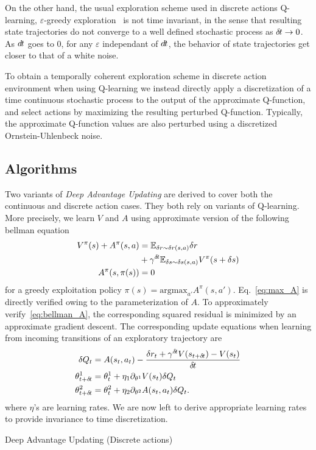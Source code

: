 On the other hand, the usual exploration scheme used in discrete actions
Q-learning, $\varepsilon$-greedy exploration~\cite{sutton} is not time
invariant, in the sense that resulting state trajectories do not converge to a
well defined stochastic process as ${\delta\hspace{-.1em}t} \rightarrow 0$. As $d\hspace{-.1em}t$ goes to $0$,
for any $\varepsilon$ independant of $d\hspace{-.1em}t$, the behavior of state trajectories get
closer to that of a white noise.

To obtain a temporally coherent exploration scheme in discrete action environment
when using Q-learning we instead directly apply a discretization of a time continuous
stochastic process to the output of the approximate Q-function, and select actions
by maximizing the resulting perturbed Q-function. Typically, the approximate Q-function
values are also perturbed using a discretized Ornstein-Uhlenbeck noise.

\subsection{Algorithms}
\label{subsec:algorithm}
Two variants of \emph{Deep Advantage Updating} are derived to cover both the continuous
and discrete action cases. They both rely on variants of Q-learning. More precisely,
we learn $V$ and $A$ using approximate version of the following bellman equation
\begin{align}
	V^{\pi}(s) + A^{\pi}(s, a) &= \mathbb{E}_{\delta r \sim \delta r(s, a)}\delta r\nonumber\\ 
				   &+ \gamma^{{\delta\hspace{-.1em}t}}  \mathbb{E}_{\delta s \sim \delta s(s, a)} V^{\pi}(s + \delta s)\label{eq:bellman_A}\\
	A^{\pi}(s, \pi(s)) &= 0\label{eq:max_A}
\end{align}
for a greedy exploitation policy $\pi(s) = \text{argmax}_{a'}A^\pi(s, a')$.
Eq.~\eqref{eq:max_A} is directly verified owing to the parameterization of $A$.
To approximately verify~\eqref{eq:bellman_A}, the corresponding squared residual
is minimized by an approximate gradient descent.
The corresponding update equations when learning from incoming transitions of
an exploratory trajectory are
\begin{align}
	\delta Q_t &= A(s_t, a_t) - \frac{\delta r_t + \gamma^{{\delta\hspace{-.1em}t}} V(s_{t+{\delta\hspace{-.1em}t}}) - V(s_t)}{{\delta\hspace{-.1em}t}}\\
	\theta^1_{t+{\delta\hspace{-.1em}t}} &= \theta^1_t + \eta_1 \partial_{\theta^1} V(s_t) \delta Q_t\\
	\theta^2_{t+{\delta\hspace{-.1em}t}} &= \theta^2_t + \eta_2 \partial_{\theta^2} A(s_t, a_t) \delta Q_t.
	\label{eq:approx_bellman_A}
\end{align}
where $\eta$'s are learning rates. We are now left to derive appropriate learning rates
to provide invariance to time discretization.
\begin{algorithm}[ht]
	\caption{Deep Advantage Updating (Discrete actions)}
	
\end{algorithm}

